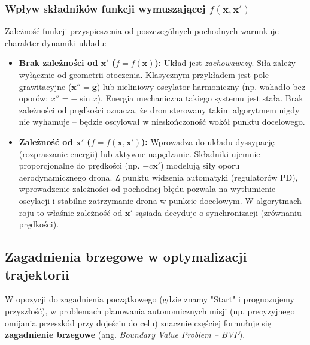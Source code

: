 \subsubsection{Wpływ składników funkcji wymuszającej $f(\mathbf{x}, \mathbf{x}')$}
Zależność funkcji przyspieszenia od poszczególnych pochodnych warunkuje charakter dynamiki układu:
\begin{itemize}
    \item \textbf{Brak zależności od $\mathbf{x}'$ ($f = f(\mathbf{x})$):} Układ jest \textit{zachowawczy}. Siła zależy wyłącznie od geometrii otoczenia. Klasycznym przykładem jest pole grawitacyjne ($\mathbf{x}'' = \mathbf{g}$) lub nieliniowy oscylator harmoniczny (np. wahadło bez oporów: $x'' = -\sin x$). Energia mechaniczna takiego systemu jest stała. Brak zależności od prędkości oznacza, że dron sterowany takim algorytmem nigdy nie wyhamuje – będzie oscylował w nieskończoność wokół punktu docelowego.
    \item \textbf{Zależność od $\mathbf{x}'$ ($f = f(\mathbf{x}, \mathbf{x}')$):} Wprowadza do układu dyssypację (rozpraszanie energii) lub aktywne napędzanie. Składniki ujemnie proporcjonalne do prędkości (np. $-c \mathbf{x}'$) modelują siły oporu aerodynamicznego drona. Z punktu widzenia automatyki (regulatorów PD), wprowadzenie zależności od pochodnej błędu pozwala na wytłumienie oscylacji i stabilne zatrzymanie drona w punkcie docelowym. W algorytmach roju to właśnie zależność od $\mathbf{x}'$ sąsiada decyduje o synchronizacji (zrównaniu prędkości).
\end{itemize}


\subsection{Zagadnienia brzegowe w optymalizacji trajektorii}

W opozycji do zagadnienia początkowego (gdzie znamy "Start" i prognozujemy przyszłość), w problemach planowania autonomicznych misji (np. precyzyjnego omijania przeszkód przy dojeściu do celu) znacznie częściej formułuje się \textbf{zagadnienie brzegowe} (ang. \textit{Boundary Value Problem -- BVP}).

